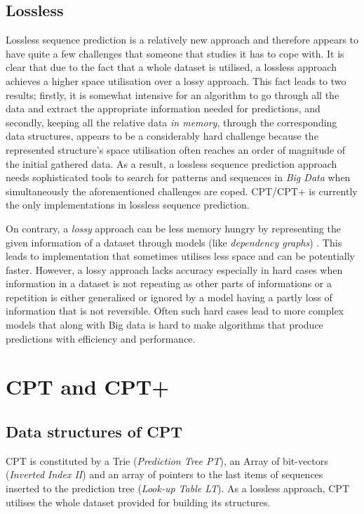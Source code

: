 \subsection*{Lossless}\label{losslessVSlossy}
Lossless sequence prediction is a relatively new approach and therefore appears to have quite a few challenges that someone that studies it has to cope with. It is clear that due to the fact that a whole dataset is utilised, a lossless approach achieves a higher space utilisation over a lossy approach. This fact leads to two results; firstly, it is somewhat intensive for an algorithm to go through all the data and extract the appropriate information needed for predictions, and secondly, keeping all the relative data \emph{in memory}, through the corresponding data structures, appears to be a considerably hard challenge because the represented structure's space utilisation often reaches an order of magnitude of the initial gathered data. As a result, a lossless sequence prediction approach needs sophisticated tools to search for patterns and sequences in \emph{Big Data} when simultaneously the aforementioned challenges are coped. CPT/CPT+ is currently the only implementations in lossless sequence prediction. 
\par On contrary, a \emph{lossy} approach can be less memory hungry by representing the given information of a dataset through models (like \emph{dependency graphs}) \cite{Padmanabhan:1996:UPP:235160.235164}. This leads to implementation that sometimes utilises less space and can be potentially faster. However, a lossy approach lacks accuracy especially in hard cases when information in a dataset is not repeating as other parts of informations or a repetition is either generalised or ignored by a model having a partly loss of information that is not reversible. Often such hard cases lead to more complex models that along with Big data is hard to make algorithms that produce predictions with efficiency and performance.

\section{CPT and CPT+}\label{CPT}

\subsection{Data structures of CPT}

CPT is constituted by a Trie (\emph{Prediction Tree PT}), an Array of bit-vectors (\emph{Inverted Index II}) and an array of pointers to the last items of sequences inserted to the prediction tree (\emph{Look-up Table LT}). As a lossless approach, CPT utilises the whole dataset provided for building its structures.

